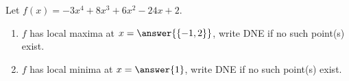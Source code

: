 \documentclass{ximera}
\author{Gregory Hartman \and Matthew Carr}
\begin{document}
\begin{exercise}






Let $f(x)=-3x^4+8x^3+6x^2-24x+2$.
\begin{enumerate}
\item		$f$ has local maxima at $x=\answer{\{-1,2\}}$, write DNE if no such point(s) exist.
\item		$f$ has local minima at $x=\answer{1}$, write DNE if no such point(s) exist.
\end{enumerate}

\end{exercise}
\end{document}
